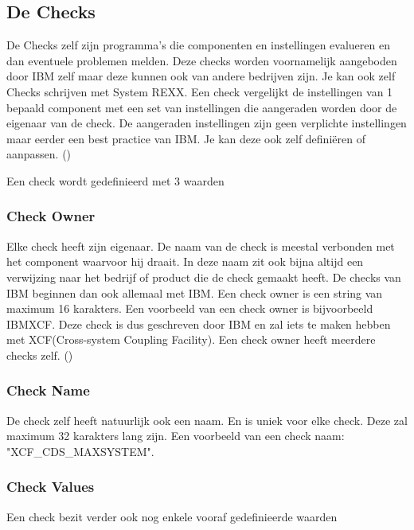 \subsection{De Checks}
\label{sec:z/OS Health Checker Checks}

De Checks zelf zijn programma's die componenten en instellingen evalueren en dan eventuele problemen melden. Deze checks worden voornamelijk aangeboden door IBM zelf maar deze kunnen ook van andere bedrijven zijn. Je kan ook zelf Checks schrijven met System REXX. Een check vergelijkt de instellingen van 1 bepaald component met een set van instellingen die aangeraden worden door de eigenaar van de check. De aangeraden instellingen zijn geen verplichte instellingen maar eerder een best practice van IBM. Je kan deze ook zelf definiëren of aanpassen. (\cite{Bezzi2010})

Een check wordt gedefinieerd met 3 waarden

\subsubsection{Check Owner}
\label{subsubsec:Check Owner}

Elke check heeft zijn eigenaar. De naam van de check is meestal verbonden met het component waarvoor hij draait. In deze naam zit ook bijna altijd een verwijzing naar het bedrijf of product die de check gemaakt heeft. De checks van IBM beginnen dan ook allemaal met IBM. Een check owner is een string van maximum 16 karakters. Een voorbeeld van een check owner is bijvoorbeeld IBMXCF. Deze check is dus geschreven door IBM en zal iets te maken hebben met XCF(Cross-system Coupling Facility). Een check owner heeft meerdere checks zelf. (\cite{Bezzi2010})

\subsubsection{Check Name}
\label{subsubsec:Check Name}

De check zelf heeft natuurlijk ook een naam. En is uniek voor elke check. Deze zal maximum 32 karakters lang zijn. Een voorbeeld van een check naam: "XCF\_CDS\_MAXSYSTEM".

\subsubsection{Check Values}
\label{subsubsec:Check Values}

Een check bezit verder ook nog enkele vooraf gedefinieerde waarden

